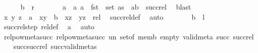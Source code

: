 \begin{isabellebody}
\ \ \ \ \isamarkupfalse%
\ {\isachardoublequoteopen}b\ {\isasymin}\ {\isacharquery}{\kern0pt}r{\isachardoublequoteclose}\isanewline
\ \ \ \ \isamarkupfalse%
\ \isamarkupfalse%
\ a\ \ a{\isacharcolon}{\kern0pt}\ {\isachardoublequoteopen}a\ {\isasymin}\ fst\ {\isacharbackquote}{\kern0pt}\ set\ as{\isachardoublequoteclose}\ \ {\isachardoublequoteopen}{\isacharparenleft}{\kern0pt}a{\isacharcomma}{\kern0pt}b{\isacharparenright}{\kern0pt}\ {\isasymin}\ succ{\isacharunderscore}{\kern0pt}rel{\isachardoublequoteclose}\ \isamarkupfalse%
\ blast\isanewline
\ \ \ \ \isamarkupfalse%
\ \isamarkupfalse%
\ x\ y\ z\ \ {\isachardoublequoteopen}a\ {\isacharequal}{\kern0pt}\ {\isacharparenleft}{\kern0pt}x{\isacharcomma}{\kern0pt}y{\isacharparenright}{\kern0pt}\ {\isasymand}\ b\ {\isacharequal}{\kern0pt}\ {\isacharparenleft}{\kern0pt}x{\isacharcomma}{\kern0pt}z{\isacharparenright}{\kern0pt}\ {\isasymand}\ {\isacharparenleft}{\kern0pt}y{\isacharcomma}{\kern0pt}z{\isacharparenright}{\kern0pt}\ {\isasymin}\ rel{\isachardoublequoteclose}\ \isamarkupfalse%
\ succ{\isacharunderscore}{\kern0pt}rel{\isacharunderscore}{\kern0pt}def\ \isamarkupfalse%
\ auto\isanewline
\ \ \ \ \isamarkupfalse%
\ \isamarkupfalse%
\ {\isachardoublequoteopen}b\ {\isasymin}\ {\isacharquery}{\kern0pt}l{\isachardoublequoteclose}\ \isamarkupfalse%
\ succ{\isacharunderscore}{\kern0pt}rel{\isacharunderscore}{\kern0pt}step\ rel{\isacharunderscore}{\kern0pt}def\ \isamarkupfalse%
\ a\ \isamarkupfalse%
\ auto\isanewline
\ \ \isamarkupfalse%
\isanewline
{}\isamarkupfalse%
%
\endisatagproof
{\isafoldproof}%
%
\isadelimproof
\isanewline
%
\endisadelimproof
\isanewline
\isanewline
{}\isamarkupfalse%
\ relpow{\isacharunderscore}{\kern0pt}meta{\isacharunderscore}{\kern0pt}succ{\isacharcolon}{\kern0pt}\ relpow{\isacharunderscore}{\kern0pt}meta{\isacharunderscore}{\kern0pt}succ\ un\ set{\isacharunderscore}{\kern0pt}of\ memb\ empty\ valid{\isacharunderscore}{\kern0pt}meta\ succ\ succ{\isacharunderscore}{\kern0pt}rel\isanewline
%
\isadelimproof
\ \ %
\endisadelimproof
%
\isatagproof
{}\isamarkupfalse%
\ succ{\isacharunderscore}{\kern0pt}succ{\isacharunderscore}{\kern0pt}rel\ succ{\isacharunderscore}{\kern0pt}valid{\isacharunderscore}{\kern0pt}metas\ \isamarkupfalse%

\end{isabellebody}
